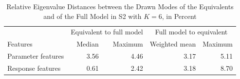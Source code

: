 \begin{table}[H]
\centering\small
\caption{Relative Eigenvalue Distances between the Drawn Modes of the Equivalents and of the Full Model in S2 with $K=6$, in Percent}
\label{tab:mode-distance}
\begin{tabular}{lrrrr}\toprule
 & \multicolumn{2}{c}{Equivalent to full model} & \multicolumn{2}{c}{Full model to equivalent}\\
Features & Median & Maximum & Weighted mean & Maximum\\\midrule
Parameter features & 3.56 & 4.46 & 3.17 & 5.11 \\
Response features & 0.61 & 2.42 & 3.18 & 8.70 \\
\bottomrule\end{tabular}\end{table}
